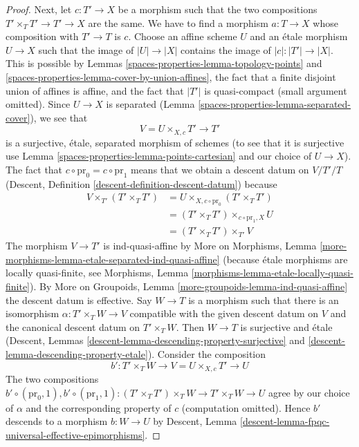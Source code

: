\begin{proof}
\medskip\noindent
Next, let $c : T' \to X$ be a morphism such that the two compositions
$T' \times_T T' \to T' \to X$ are the same. We have to find a morphism
$a : T \to X$ whose composition with $T' \to T$ is $c$. Choose an
affine scheme $U$ and an \'etale morphism $U \to X$ such that the image
of $|U| \to |X|$ contains the image of $|c| : |T'| \to |X|$.
This is possible by Lemmas \ref{spaces-properties-lemma-topology-points} and
\ref{spaces-properties-lemma-cover-by-union-affines}, the fact that a finite disjoint union of
affines is affine, and the fact that $|T'|$ is quasi-compact
(small argument omitted). Since $U \to X$ is separated
(Lemma \ref{spaces-properties-lemma-separated-cover}), we see that
$$
V = U \times_{X, c} T' \longrightarrow T'
$$
is a surjective, \'etale, separated morphism of schemes
(to see that it is surjective use Lemma \ref{spaces-properties-lemma-points-cartesian}
and our choice of $U \to X$). The fact that
$c \circ \text{pr}_0 = c \circ \text{pr}_1$ means that we obtain a
descent datum on $V/T'/T$
(Descent, Definition \ref{descent-definition-descent-datum})
because
\begin{align*}
V \times_{T'} (T' \times_T T')
& =
U \times_{X, c \circ \text{pr}_0} (T' \times_T T') \\
& =
(T' \times_T T') \times_{c \circ \text{pr}_1, X} U \\
& =
(T' \times_T T') \times_{T'} V
\end{align*}
The morphism $V \to T'$ is ind-quasi-affine by
More on Morphisms, Lemma
\ref{more-morphisms-lemma-etale-separated-ind-quasi-affine}
(because \'etale morphisms are locally quasi-finite, see
Morphisms, Lemma \ref{morphisms-lemma-etale-locally-quasi-finite}).
By More on Groupoids, Lemma \ref{more-groupoids-lemma-ind-quasi-affine}
the descent datum is effective. Say $W \to T$ is a morphism
such that there is an isomorphism $\alpha : T' \times_T W \to V$
compatible with the given descent datum on $V$ and the canonical descent
datum on $T' \times_T W$. Then $W \to T$ is surjective and \'etale
(Descent, Lemmas \ref{descent-lemma-descending-property-surjective} and
\ref{descent-lemma-descending-property-etale}).
Consider the composition
$$
b' : T' \times_T W \longrightarrow V = U \times_{X, c} T' \longrightarrow U
$$
The two compositions
$b' \circ (\text{pr}_0, 1),
b' \circ (\text{pr}_1, 1) :
(T' \times_T T') \times_T W \to T' \times_T W \to U$
agree by our choice of $\alpha$ and the corresponding property of $c$
(computation omitted). Hence $b'$ descends to a morphism $b : W \to U$ by
Descent, Lemma \ref{descent-lemma-fpqc-universal-effective-epimorphisms}.

\end{proof}
